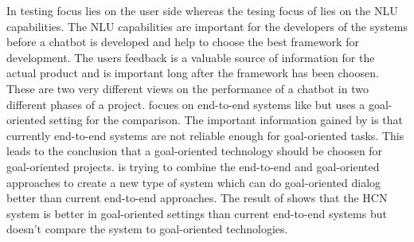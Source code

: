 In \citet{evaluateChatbotsShawar2007} testing focus lies on the user side whereas the tesing focus of 
\citet{braunEvaluatingNLU} lies on the NLU capabilities.
The NLU capabilities are important for the developers of the systems before a chatbot
is developed and help to choose the best framework for development.
The users feedback is a valuable source of information for the actual product and
is important long after the framework has been choosen.
These are two very different views on the performance of a chatbot in two different phases of a project.
\citet{bordes2016learning} focues on end-to-end systems like \citet{evaluateChatbotsShawar2007, williams2017hybrid}
but uses a goal-oriented setting for the comparison.
The important information gained by \citet{bordes2016learning} is that currently end-to-end systems 
are not reliable enough for goal-oriented tasks.
This leads to the conclusion that a goal-oriented technology should be choosen for goal-oriented 
projects.
\citet{williams2017hybrid} is trying to combine the end-to-end and goal-oriented approaches to 
create a new type of system which can do goal-oriented dialog better than current end-to-end
approaches. 
The result of \citet{williams2017hybrid} shows that the HCN system is better in goal-oriented 
settings than current end-to-end systems but doesn't compare the system to goal-oriented technologies.


